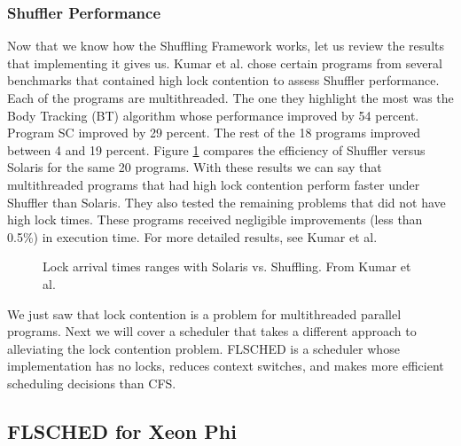 \documentclass{sig-alternate}
\begin{document}
\vspace{1 mm}

\subsubsection{Shuffler Performance}

Now that we know how the Shuffling Framework works, let us review the results that implementing it gives us. Kumar et al. chose certain programs from several benchmarks that contained high lock contention to assess Shuffler performance.  Each of the programs are multithreaded. The one they highlight the most was the Body Tracking (BT) algorithm whose performance improved by 54 percent. Program SC improved by 29 percent. The rest of the 18 programs improved between 4 and 19 percent. Figure \ref{fig:shuf_vs_solaris} compares the efficiency of Shuffler versus Solaris for the same 20 programs. With these results we can say that multithreaded programs that had high lock contention perform faster under Shuffler than Solaris. They also tested the remaining problems that did not have high lock times. These programs received negligible improvements (less than 0.5\%) in execution time. For more detailed results, see Kumar et al.~\cite{Kumar:2014}

\begin{figure}
\centering
{}
\caption{Lock arrival times ranges with Solaris vs. Shuffling. From Kumar et al.~\cite{Kumar:2014}}
\label{fig:shuf_vs_solaris}
\end{figure}

We just saw that lock contention is a problem for multithreaded parallel programs. Next we will cover a scheduler that takes a different approach to alleviating the lock contention problem. FLSCHED is a scheduler whose implementation has no locks, reduces context switches, and makes more efficient scheduling decisions than CFS.~\cite{Jo:2017}

\subsection{FLSCHED for Xeon Phi}
\label{sec:flsched}
\end{document}
